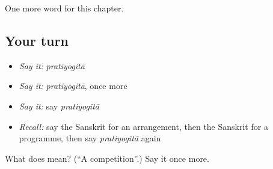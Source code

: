 \begin{grammarlens}[title={What you've built}]
One more word for this chapter.
\end{grammarlens}

\subsection*{Your turn}
\begin{itemize}
\raggedright
  \item \emph{Say it:} \emph{pratiyogitā}
  \item \emph{Say it:} \emph{pratiyogitā}, once more
  \item \emph{Say it:} say \emph{pratiyogitā}
  \item \emph{Recall:} say the Sanskrit for an arrangement, then the Sanskrit for a programme, then say \emph{pratiyogitā} again
\end{itemize}

\begin{tcolorbox}[breakable,colback=teal!4,colframe=teal!35!black,title={Before you move on}]
What does  mean? (\textquotedblleft{}A competition\textquotedblright{}.) Say it once more.
\end{tcolorbox}
